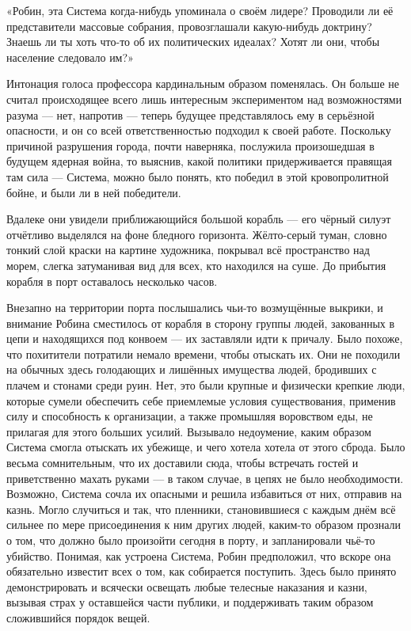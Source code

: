 \documentclass[a5paper, 9pt,
final, openany, twoside=true]{memoir}
\begin{document}
«Робин, эта Система когда-нибудь упоминала о своём лидере? Проводили ли её представители массовые собрания, провозглашали какую-нибудь доктрину? Знаешь ли ты хоть что-то об их политических идеалах? Хотят ли они, чтобы население следовало им?»

Интонация голоса профессора кардинальным образом поменялась. Он больше не считал происходящее всего лишь интересным экспериментом над возможностями разума — нет, напротив — теперь будущее представлялось ему в серьёзной опасности, и он со всей ответственностью подходил к своей работе. Поскольку причиной разрушения города, почти наверняка, послужила произошедшая в будущем ядерная война, то выяснив, какой политики придерживается правящая там сила — Система, можно было понять, кто победил в этой кровопролитной бойне, и были ли в ней победители.\bigskip

Вдалеке они увидели приближающийся большой корабль — его чёрный силуэт отчётливо выделялся на фоне бледного горизонта. Жёлто-серый туман, словно тонкий слой краски на картине художника, покрывал всё пространство над морем, слегка затуманивая вид для всех, кто находился на суше. До прибытия корабля в порт оставалось несколько часов.

Внезапно на территории порта послышались чьи-то возмущённые выкрики, и внимание Робина сместилось от корабля в сторону группы людей, закованных в цепи и находящихся под конвоем — их заставляли идти к причалу. Было похоже, что похитители потратили немало времени, чтобы отыскать их. Они не походили на обычных здесь голодающих и лишённых имущества людей, бродивших с плачем и стонами среди руин. Нет, это были крупные и физически крепкие люди, которые сумели обеспечить себе приемлемые условия существования, применив силу и способность к организации, а также промышляя воровством еды, не прилагая для этого больших усилий. Вызывало недоумение, каким образом Система смогла отыскать их убежище, и чего хотела хотела от этого сброда. Было весьма сомнительным, что их доставили сюда, чтобы встречать гостей и приветственно махать руками — в таком случае, в цепях не было необходимости. Возможно, Система сочла их опасными и решила избавиться от них, отправив на казнь. Могло случиться и так, что пленники, становившиеся с каждым днём всё сильнее по мере присоединения к ним других людей, каким-то образом прознали о том, что должно было произойти сегодня в порту, и запланировали чьё-то убийство. Понимая, как устроена Система, Робин предположил, что вскоре она обязательно известит всех о том, как собирается поступить. Здесь было принято демонстрировать и всячески освещать любые телесные наказания и казни, вызывая страх у оставшейся части публики, и поддерживать таким образом сложившийся порядок вещей.\bigskip
\end{document}
